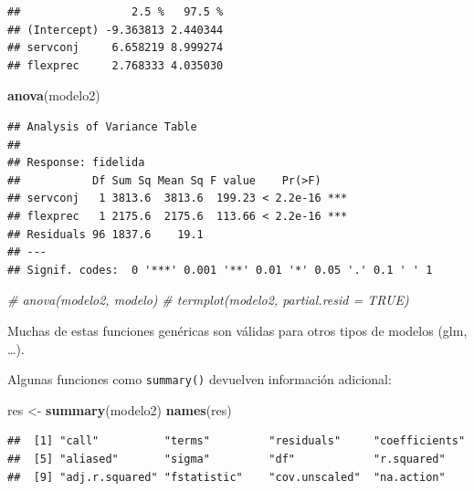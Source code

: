 \documentclass[]{book}
\newenvironment{Shaded}{\begin{snugshade}}{\end{snugshade}}
\newcommand{\CommentTok}[1]{\textcolor[rgb]{0.56,0.35,0.01}{\textit{#1}}}
\newcommand{\KeywordTok}[1]{\textcolor[rgb]{0.13,0.29,0.53}{\textbf{#1}}}
\newcommand{\NormalTok}[1]{#1}
\newcommand{\OperatorTok}[1]{\textcolor[rgb]{0.81,0.36,0.00}{\textbf{#1}}}
\newcommand{\StringTok}[1]{\textcolor[rgb]{0.31,0.60,0.02}{#1}}
\begin{document}
\begin{verbatim}
##                 2.5 %   97.5 %
## (Intercept) -9.363813 2.440344
## servconj     6.658219 8.999274
## flexprec     2.768333 4.035030
\end{verbatim}

\begin{Shaded}
\begin{Highlighting}[]
\KeywordTok{anova}\NormalTok{(modelo2)}
\end{Highlighting}
\end{Shaded}

\begin{verbatim}
## Analysis of Variance Table
## 
## Response: fidelida
##           Df Sum Sq Mean Sq F value    Pr(>F)    
## servconj   1 3813.6  3813.6  199.23 < 2.2e-16 ***
## flexprec   1 2175.6  2175.6  113.66 < 2.2e-16 ***
## Residuals 96 1837.6    19.1                      
## ---
## Signif. codes:  0 '***' 0.001 '**' 0.01 '*' 0.05 '.' 0.1 ' ' 1
\end{verbatim}

\begin{Shaded}
\begin{Highlighting}[]
\CommentTok{# anova(modelo2, modelo)}
\CommentTok{# termplot(modelo2, partial.resid = TRUE)}
\end{Highlighting}
\end{Shaded}

Muchas de estas funciones genéricas son válidas para otros tipos de
modelos (glm, \ldots{}).

Algunas funciones como \texttt{summary()} devuelven información adicional:

\begin{Shaded}
\begin{Highlighting}[]
\NormalTok{res <-}\StringTok{ }\KeywordTok{summary}\NormalTok{(modelo2)}
\KeywordTok{names}\NormalTok{(res)}
\end{Highlighting}
\end{Shaded}

\begin{verbatim}
##  [1] "call"          "terms"         "residuals"     "coefficients" 
##  [5] "aliased"       "sigma"         "df"            "r.squared"    
##  [9] "adj.r.squared" "fstatistic"    "cov.unscaled"  "na.action"
\end{verbatim}

\begin{Shaded}
\end{Shaded}
\end{document}
